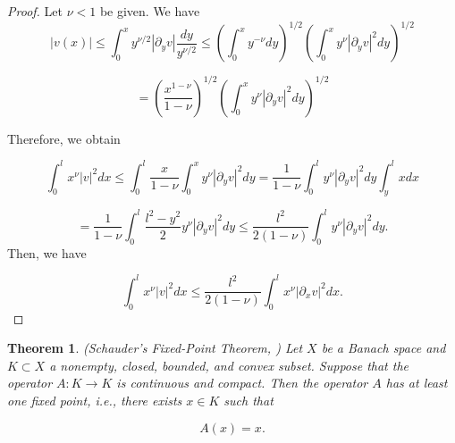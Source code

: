 \documentclass[reqno]{amsart}
\newtheorem{thm}{Theorem}[section]
\theoremstyle{definition}
\numberwithin{equation}{section}
\begin{document}
\begin{proof}
    Let $\nu < 1$ be given. We have 
\begin{equation*}
    |v(x)|\leq \int_0^x y^{\nu/2}|\partial_y v|\frac{dy}{y^{\nu/2}}\leq \left(\int_0^xy^{-\nu}dy\right)^{1/2}\left(\int_0^x y^{\nu}|\partial_{y}v |^2dy\right)^{1/2}
\end{equation*}

\begin{equation*}
    =\left(\frac{x^{1-\nu}}{1-\nu}\right)^{1/2}\left(\int_0^x y^{\nu}|\partial_{y}v|^2dy\right)^{1/2}
\end{equation*}

Therefore, we obtain 

\begin{equation*}
    \int_0^l x^\nu |v|^2dx\leq \int_0^l \frac{x}{1-\nu}\int_0^x y^{\nu}|\partial_y v|^2dy=\frac{1}{1-\nu}\int_0^ly^\nu |\partial_y v|^2dy\int_y^lxdx
\end{equation*}

\begin{equation*}
    =\frac{1}{1-\nu}\int_0^l\frac{l^2-y^2}{2}y^{\nu}|\partial_y v|^2dy\leq\frac{l^2}{2(1-\nu)}\int_0^ly^\nu |\partial_y v|^2dy.
\end{equation*}
Then, we have 

\begin{equation*}
    \int_0^l x^\nu |v|^2dx\leq\frac{l^2}{2(1-\nu)}\int_0^lx^\nu |\partial_x v |^2dx.
\end{equation*}














    
\end{proof}
\begin{thm}\label{Schauder} 
(Schauder's Fixed-Point Theorem, \cite{Zeidler}) Let $X$ be a Banach space and $K \subset X$ a nonempty, closed, bounded, and convex subset. Suppose that the operator $A: K \rightarrow K$ is continuous and compact. Then the operator $A$ has at least one fixed point, i.e., there exists $x \in K$ such that

$$
A(x)=x.
$$
\end{thm} 
\end{document}
